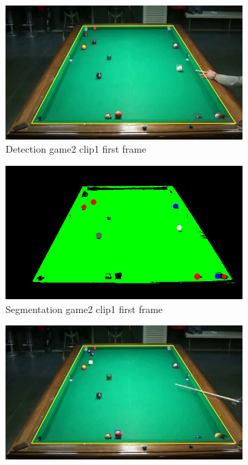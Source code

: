 \begin{figure}[H]
    \centering
    \begin{subfigure}[b]{0.35\textwidth}
        \centering
        \includegraphics[width=\textwidth]{images/Detection/game2_clip1_detected_balls_first_frame.jpg}
        \caption{Detection game2 clip1 first frame}
        \label{fig: game2_clip1_first_frame_detected}
    \end{subfigure}
    \begin{subfigure}[b]{0.35\textwidth}
        \centering
        \includegraphics[width=\textwidth]{images/Segmentation/game2_clip1_segmented_balls_first_frame.jpg}
        \caption{Segmentation game2 clip1 first frame}
		\label{fig: game2_clip1_first_frame_segmented}
    \end{subfigure}
    \centering
    \begin{subfigure}[b]{0.35\textwidth}
        \centering
        \includegraphics[width=\textwidth]{images/Detection/game2_clip1_detected_balls_last_frame.jpg}

\end{subfigure}
\end{figure}
